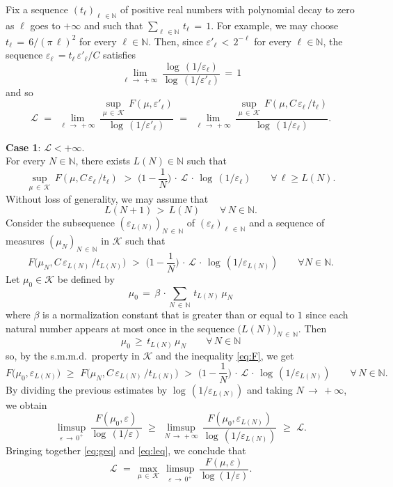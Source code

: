 \documentclass[11pt,a4paper,reqno]{amsart}
\theoremstyle{plain}
\theoremstyle{definition}
\newcommand{\field}[1]{\mathbb{#1}}
\newcommand{\NN}{\field{N}}
\newcommand{\ep} {\varepsilon}
\newcommand{\cK}{{\mathcal K}}
\begin{document}
\smallskip

Fix a sequence $(t_\ell)_{\ell \, \in \mathbb{N}}$ of positive real numbers with polynomial decay to zero as $\ell$ goes to $+\infty$ and such that $\sum_{\ell \, \in \mathbb{N}} \,t_\ell\,=\,1$. For example, we may choose $t_\ell\,=\,6/(\pi\,\ell)^2$ for every $\ell \in \NN$. Then, since $\ep'_\ell \, < \, 2^{-\ell}$ for every $\ell \in \NN$, the sequence $\ep_\ell\,= t_\ell\,\ep'_\ell/C$ satisfies
$$\lim_{\ell\,\to\,+\infty}\,\frac{\log\,(1/\ep_\ell)}{\log\,(1/\ep'_\ell)} \, = \, 1$$
and so 
$$\mathcal{L} \,\,=\,\, \lim_{\ell\,\to\,+\infty}\,\frac{\sup_{\mu\,\in\,\cK}\, F(\mu,\ep'_\ell)}{\log\,(1/\ep'_\ell)} \,\,=\,\,  \lim_{\ell\,\to\,+\infty}\,\frac{\sup_{\mu\,\in\,\cK}\, F(\mu,C\,\ep_\ell\,/t_\ell)}{\log\,(1/\ep_\ell)}.$$


\medskip

\noindent \textbf{Case 1}: $\mathcal{L} < +\infty$. \\

For every $N \in \NN$, there exists $L(N)\in\NN$ such that 
\begin{equation}\label{L(N)condition}
\sup_{\mu\,\in\,\cK}\, F(\mu,C\,\ep_\ell\,/t_\ell)\,\, > \,\,\Big(1-\frac{1}{N}\Big)\,\cdot\,\mathcal{L}\,\cdot \,\log\,(1/\ep_\ell) \qquad \forall\,\ell \geq L(N).
\end{equation} 
Without loss of generality, we may assume that $$L(N+1)\,>\,L(N) \quad \quad \forall\, N\in\NN.$$
Consider the subsequence $(\ep_{L(N)})_{N\,\in\,\NN}$ of $(\ep_\ell)_{\ell \,\in\, \NN}$ and a sequence of measures $(\mu_N)_{N\,\in\,\NN}$ in $\cK$ such that 
\begin{equation}\label{eq:F}
F\big(\mu_N,C\,\ep_{L(N)}\,/t_{L(N)}\big) \,\,>\,\, 
    \Big(1-\frac{1}{N}\Big)\,\cdot\,
\mathcal{L}\,\cdot\,\log\,(1/\ep_{L(N)}) \qquad\forall N\in\NN.  
\end{equation}
Let $\mu_0\in\cK$ be defined by $$\mu_0\,=\,\beta\,\cdot\sum_{N\,\in\,\NN}\,t_{L(N)}\,\mu_N$$
where $\beta$ is a normalization constant that is greater than or equal to $1$ since each natural number appears at most once in the sequence $\big({L(N)}\big)_{N\,\in\,\NN}$. Then 
$$\mu_0\,\geq \,t_{L(N)}\,\mu_N \quad \quad \forall\, N\in\NN$$
so, by the s.m.m.d.~property in $\cK$ and the inequality \eqref{eq:F}, we get 
$$F\big(\mu_0,\ep_{L(N)}\big) \,\,\geq \,\, F\big(\mu_N,C\,\ep_{L(N)}\,/t_{L(N)}\big)  \,\,>\,\,
    \Big(1-\frac{1}{N}\Big)\,\cdot\,
\mathcal{L}\,\cdot\,\log\,(1/\ep_{L(N)}) \qquad\forall\, N\in\NN.$$
By dividing the previous estimates by $\log\,(1/\ep_{L(N)})$ and taking $N\,\to\,+\infty$, we obtain 
\begin{equation}\label{eq:leq}
\limsup_{\ep\,\to\,0^+}\,\frac{F(\mu_0,\ep)}{\log\,(1/\ep)}\,\,\geq\,\,\limsup_{N\,\to\,+\infty}\,\frac{F(\mu_0,\ep_{L(N)})}{\log\,(1/\ep_{L(N)})}\,\,\geq\,\,\mathcal{L}.
\end{equation}
Bringing together \eqref{eq:geq} and \eqref{eq:leq}, we conclude that
$$\mathcal{L}\,\, =\, \max_{\mu\,\in\,\cK}\,\limsup_{\ep\,\to\,0^+}\,
\frac{F(\mu,\ep)}{\log(1/\ep)}.$$
\end{document}
